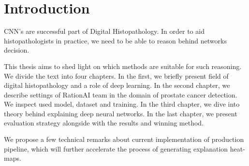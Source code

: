 \chapter{Introduction}\label{chap:introduction}

CNN's are successful part of Digital Histopathology. In order to aid histopathologists in practice, we need to be able to reason behind networks decision.

This thesis aims to shed light on which methods are suitable for such reasoning. We divide the text into four chapters. In the first, we briefly present field of digital histopathology and a role of deep learning. In the second chapter, we describe settings of RationAI team in the domain of prostate cancer detection. We inspect used model, dataset and training. In the third chapter, we dive into theory behind explaining deep neural networks. In the last chapter, we present evaluation strategy alongside with the results and winning method.

We propose a few technical remarks about current implementation of production pipeline, which will further accelerate the process of generating explanation heat-maps.